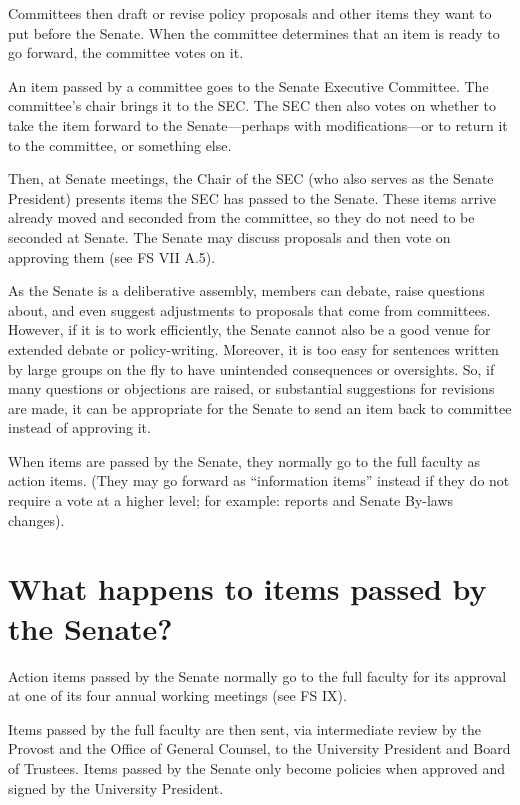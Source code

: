 \documentclass[12pt]{article}
\begin{document}
Committees then draft or revise policy proposals and other items they
want to put before the Senate. When the committee determines that an
item is ready to go forward, the committee votes on it.

An item passed by a committee goes to the Senate Executive Committee.
The committee's chair brings it to the SEC. The SEC then also votes on
whether to take the item forward to the Senate---perhaps with
modifications---or to return it to the committee, or something else.

Then, at Senate meetings, the Chair of the SEC (who also serves as the Senate President) presents items the SEC has passed to the Senate. These items arrive already moved and seconded from the committee, so they do not need to be seconded at Senate. The Senate may discuss proposals and then vote on approving them (see FS VII A.5). 

As the Senate is a deliberative assembly, members can debate, raise
questions about, and even suggest adjustments to proposals that come
from committees. However, if it is to work efficiently, the Senate
cannot also be a good venue for extended debate or policy-writing.
Moreover, it is too easy for sentences written by large groups on the
fly to have unintended consequences or oversights. So, if many questions
or objections are raised, or substantial suggestions for revisions are
made, it can be appropriate for the Senate to send an item back to
committee instead of approving it.

When items are passed by the Senate, they normally go to the full
faculty as action items. (They may go forward as “information items” instead if they do not require a vote at a higher level; for example: reports and Senate By-laws changes).

\section{What happens to items passed by the
Senate?}\label{what-happens-to-items-passed-by-the-senate}

Action items passed by the Senate normally go to the full faculty for
its approval at one of its four annual working meetings (see FS IX).

Items passed by the full faculty are then sent, via intermediate review
by the Provost and the Office of General Counsel, to the University
President and Board of Trustees. Items passed by the Senate only become
policies when approved and signed by the University President.
\end{document}
